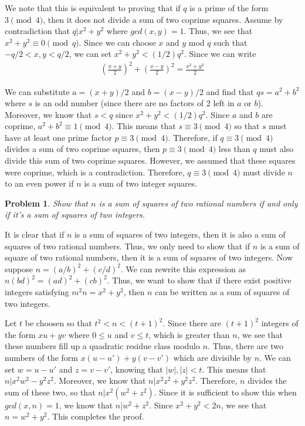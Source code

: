 \documentclass[psamsfonts]{amsart}
\newtheorem{prob}{Problem}[section]
\newenvironment{sol}{{\bfseries Solution}}{\qedsymbol}
\theoremstyle{definition}
\theoremstyle{remark}
\numberwithin{equation}{section}
\begin{document}
\begin{sol}
We note that this is equivalent to proving that if $q$ is a prime of the form $3 \pmod{4}$, then it does not divide a sum of two coprime squares. Assume by contradiction that $q | x^2 + y^2$ where $gcd(x,y) = 1$. Thus, we see that $x^2 + y^2 \equiv 0 \pmod{q}$. Since we can choose $x$ and $y$ mod $q$ such that $-q/2 < x,y < q/2$, we can set $x^2 + y^2 < (1/2) q^2$. Since we can write
\begin{eqnarray}
\left( \frac{x+y}{2} \right)^2 + \left( \frac{x - y}{2} \right)^2 = \frac{x^2 + y^2}{2}
\end{eqnarray}

We can substitute $a = (x+y)/2$ and $b = (x-y)/2$ and find that $qs = a^2 + b^2$ where $s$ is an odd number (since there are no factors of 2 left in $a$ or $b$). Moreover, we know that $s < q$ since $x^2 + y^2 < (1/2) q^2$. Since $a$ and $b$ are coprime, $a^2 + b^2 \equiv 1 \pmod{4}$. This means that $s \equiv 3 \pmod {4}$ so that $s$ must have at least one prime factor $p \equiv 3 \pmod{4}$. Therefore, if $q \equiv 3 \pmod{4}$ divides a sum of two coprime squares, then $p \equiv 3 \pmod{4}$ less than $q$ must also divide this sum of two coprime squares. However, we assumed that these squares were coprime, which is a contradiction. Therefore, $q \equiv 3 \pmod{4}$ must divide $n$ to an even power if $n$ is a sum of two integer squares.
\end{sol}

\begin{prob}
Show that $n$ is a sum of squares of two rational numbers if and only if it's a sum of squares of two integers.
\end{prob}

\begin{sol}
It is clear that if $n$ is a sum of squares of two integers, then it is also a sum of squares of two rational numbers. Thus, we only need to show that if $n$ is a sum of square of two rational numbers, then it is a sum of squares of two integers. Now suppose $n = (a/b)^2 + (c/d)^2$. We can rewrite this expression as $n(bd)^2 = (ad)^2 + (cb)^2$. Thus, we want to show that if there exist positive integers satisfying $m^2 n = x^2 + y^2$, then $n$ can be written as a sum of squares of two integers. 

Let $t$ be choosen so that $t^2 < n < (t+1)^2$. Since there are $(t+1)^2$ integers of the form $xu + yv$ where $0 \leq u$ and $v \leq t$, which is greater than $n$, we see that these numbers fill up a quadratic residue class modulo $n$. Thus, there are two numbers of the form $x (u - u') + y(v-v')$ which are divisible by $n$. We can set $w = u - u'$ and $z = v - v'$, knowing that $|w|, |z| < t$. This means that $n | x^2 w^2 - y^2 z^2$. Moreover, we know that $n | x^2 z^2 + y^2 z^2$. Therefore, $n$ divides the sum of these two, so that $n | x^2 ( w^2 + z^2)$. Since it is sufficient to show this when $gcd(x,n) =1$, we know that $n |  w^2 + z^2$. Since $x^2 + y^2 < 2n$, we see that $n = w^2 + y^2$. This completes the proof.
\end{sol}
\end{document}
